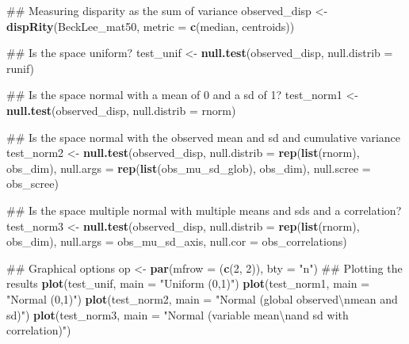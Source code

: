 \documentclass[]{book}
\newenvironment{Shaded}{\begin{snugshade}}{\end{snugshade}}
\newcommand{\KeywordTok}[1]{\textcolor[rgb]{0.13,0.29,0.53}{\textbf{#1}}}
\newcommand{\DataTypeTok}[1]{\textcolor[rgb]{0.13,0.29,0.53}{#1}}
\newcommand{\DecValTok}[1]{\textcolor[rgb]{0.00,0.00,0.81}{#1}}
\newcommand{\CharTok}[1]{\textcolor[rgb]{0.31,0.60,0.02}{#1}}
\newcommand{\StringTok}[1]{\textcolor[rgb]{0.31,0.60,0.02}{#1}}
\newcommand{\NormalTok}[1]{#1}
\theoremstyle{definition}
\theoremstyle{definition}
\theoremstyle{remark}
\begin{document}
\begin{Shaded}
\begin{Highlighting}[]
\NormalTok{## Measuring disparity as the sum of variance}
\NormalTok{observed_disp <-}\StringTok{ }\KeywordTok{dispRity}\NormalTok{(BeckLee_mat50, }\DataTypeTok{metric =} \KeywordTok{c}\NormalTok{(median, centroids))}

\NormalTok{## Is the space uniform?}
\NormalTok{test_unif <-}\StringTok{ }\KeywordTok{null.test}\NormalTok{(observed_disp, }\DataTypeTok{null.distrib =}\NormalTok{ runif)}

\NormalTok{## Is the space normal with a mean of 0 and a sd of 1?}
\NormalTok{test_norm1 <-}\StringTok{ }\KeywordTok{null.test}\NormalTok{(observed_disp, }\DataTypeTok{null.distrib =}\NormalTok{ rnorm)}

\NormalTok{## Is the space normal with the observed mean and sd and cumulative variance}
\NormalTok{test_norm2 <-}\StringTok{ }\KeywordTok{null.test}\NormalTok{(observed_disp, }\DataTypeTok{null.distrib =} \KeywordTok{rep}\NormalTok{(}\KeywordTok{list}\NormalTok{(rnorm), obs_dim),}
                        \DataTypeTok{null.args =} \KeywordTok{rep}\NormalTok{(}\KeywordTok{list}\NormalTok{(obs_mu_sd_glob), obs_dim),}
                        \DataTypeTok{null.scree =}\NormalTok{ obs_scree)}

\NormalTok{## Is the space multiple normal with multiple means and sds and a correlation?}
\NormalTok{test_norm3 <-}\StringTok{ }\KeywordTok{null.test}\NormalTok{(observed_disp, }\DataTypeTok{null.distrib =} \KeywordTok{rep}\NormalTok{(}\KeywordTok{list}\NormalTok{(rnorm), obs_dim),}
                        \DataTypeTok{null.args =}\NormalTok{ obs_mu_sd_axis, }\DataTypeTok{null.cor =}\NormalTok{ obs_correlations)}


\NormalTok{## Graphical options}
\NormalTok{op <-}\StringTok{ }\KeywordTok{par}\NormalTok{(}\DataTypeTok{mfrow =}\NormalTok{ (}\KeywordTok{c}\NormalTok{(}\DecValTok{2}\NormalTok{, }\DecValTok{2}\NormalTok{)), }\DataTypeTok{bty =} \StringTok{"n"}\NormalTok{)}
\NormalTok{## Plotting the results}
\KeywordTok{plot}\NormalTok{(test_unif, }\DataTypeTok{main =} \StringTok{"Uniform (0,1)"}\NormalTok{)}
\KeywordTok{plot}\NormalTok{(test_norm1, }\DataTypeTok{main =} \StringTok{"Normal (0,1)"}\NormalTok{)}
\KeywordTok{plot}\NormalTok{(test_norm2, }\DataTypeTok{main =} \StringTok{"Normal (global observed}\CharTok{\textbackslash{}n}\StringTok{mean and sd)"}\NormalTok{)}
\KeywordTok{plot}\NormalTok{(test_norm3, }\DataTypeTok{main =} \StringTok{"Normal (variable mean}\CharTok{\textbackslash{}n}\StringTok{and sd with correlation)"}\NormalTok{)}
\end{Highlighting}
\end{Shaded}
\end{document}
